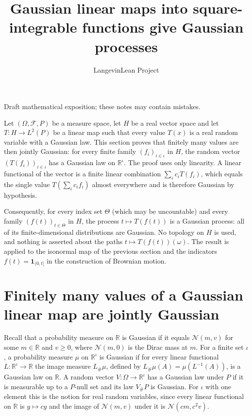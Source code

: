 \documentclass[11pt,a4paper]{article}
\title{\texorpdfstring{Gaussian linear maps into square-integrable functions give Gaussian processes}{Gaussian linear maps into square-integrable functions give Gaussian processes}}
\author{LangevinLean Project}
\date{}
\begin{document}
\maketitle
Draft mathematical exposition; these notes may contain mistakes.


Let \((\Omega,\mathcal F,P)\) be a measure space, let \(H\) be a real vector space and let \(T:H\to L^2(P)\) be a linear map such that every value \(T(x)\) is a real random variable with a Gaussian law. This section proves that finitely many values are then jointly Gaussian: for every finite family \((f_i)_{i\in\iota}\) in \(H\), the random vector \((T(f_i))_{i\in\iota}\) has a Gaussian law on \(\mathbb R^\iota\). The proof uses only linearity. A linear functional of the vector is a finite linear combination \(\sum_ic_iT(f_i)\), which equals the single value \(T(\sum_ic_if_i)\) almost everywhere and is therefore Gaussian by hypothesis.




Consequently, for every index set \(\Theta\) (which may be uncountable) and every family \((f(t))_{t\in\Theta}\) in \(H\), the process \(t\mapsto T(f(t))\) is a Gaussian process: all of its finite-dimensional distributions are Gaussian. No topology on \(H\) is used, and nothing is asserted about the paths \(t\mapsto T(f(t))(\omega)\). The result is applied to the isonormal map of the previous section and the indicators \(f(t)=\mathbf 1_{(0,t]}\) in the construction of Brownian motion.


\section{\texorpdfstring{Finitely many values of a Gaussian linear map are jointly Gaussian}{Finitely many values of a Gaussian linear map are jointly Gaussian}}


Recall that a probability measure on \(\mathbb R\) is Gaussian if it equals \(\mathcal N(m,v)\) for some \(m\in\mathbb R\) and \(v\ge0\), where \(\mathcal N(m,0)\) is the Dirac mass at \(m\). For a finite set \(\iota\), a probability measure \(\mu\) on \(\mathbb R^\iota\) is Gaussian if for every linear functional \(L:\mathbb R^\iota\to\mathbb R\) the image measure \(L_\#\mu\), defined by \(L_\#\mu(A)=\mu(L^{-1}(A))\), is a Gaussian law on \(\mathbb R\). A random vector \(V:\Omega\to\mathbb R^\iota\) has a Gaussian law under \(P\) if it is measurable up to a \(P\)-null set and its law \(V_\#P\) is Gaussian. For \(\iota\) with one element this is the notion for real random variables, since every linear functional on \(\mathbb R\) is \(y\mapsto cy\) and the image of \(\mathcal N(m,v)\) under it is \(\mathcal N(cm,c^2v)\).
\end{document}
